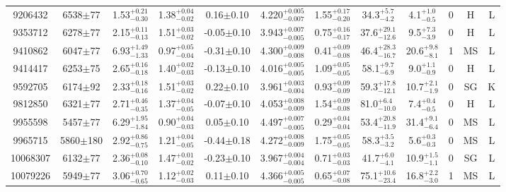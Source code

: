\begin{landscape}
\begin{longtable}{c|ccccc|ccc|ccc}
	9206432 & 6538$\pm$77    & 1.53$_{-0.30}^{+0.21}$    & 1.38$_{-0.02}^{+0.04}$ & 0.16$\pm$0.10     & 4.220$_{-0.007}^{+0.005}$ & 1.55$_{-0.20}^{+0.17}$ & 34.3$_{-4.2}^{+5.7}$      & 4.1$_{-0.5}^{+1.0}$      & 0 &        H & L \\
	9353712 & 6278$\pm$77    & 2.15$_{-0.13}^{+0.11}$    & 1.51$_{-0.02}^{+0.03}$ & -0.05$\pm$0.10    & 3.943$_{-0.005}^{+0.007}$ & 0.75$_{-0.17}^{+0.16}$ & 37.6$_{-12.6}^{+29.1}$    & 9.5$_{-3.9}^{+7.3}$      & 0 &        H & L \\
	9410862 & 6047$\pm$77    & 6.93$_{-1.33}^{+1.49}$    & 0.97$_{-0.04}^{+0.05}$ & -0.31$\pm$0.10    & 4.300$_{-0.008}^{+0.009}$ & 0.41$_{-0.08}^{+0.09}$ & 46.4$_{-16.7}^{+28.3}$    & 20.6$_{-8.1}^{+9.8}$     & 1 &        MS & L \\
	9414417 & 6253$\pm$75    & 2.65$_{-0.18}^{+0.16}$    & 1.40$_{-0.03}^{+0.02}$ & -0.13$\pm$0.10    & 4.016$_{-0.005}^{+0.005}$ & 1.09$_{-0.05}^{+0.05}$ & 58.1$_{-6.9}^{+9.7}$      & 9.0$_{-0.9}^{+1.1}$      & 0 &        H & L \\
	9592705 & 6174$\pm$92    & 2.33$_{-0.16}^{+0.18}$    & 1.51$_{-0.02}^{+0.03}$ & 0.22$\pm$0.10     & 3.961$_{-0.004}^{+0.003}$ & 0.93$_{-0.09}^{+0.09}$ & 59.3$_{-12.1}^{+17.8}$    & 10.7$_{-1.9}^{+2.1}$     & 0 &        SG & K \\
	9812850 & 6321$\pm$77    & 2.71$_{-0.35}^{+0.46}$    & 1.37$_{-0.05}^{+0.04}$ & -0.07$\pm$0.10    & 4.053$_{-0.009}^{+0.008}$ & 1.54$_{-0.08}^{+0.09}$ & 81.0$_{-10.0}^{+6.4}$      & 7.4$_{-0.5}^{+0.4}$     & 0 &        H & L \\
	9955598 & 5457$\pm$77    & 6.29$_{-1.84}^{+1.95}$    & 0.90$_{-0.03}^{+0.04}$ & 0.05$\pm$0.10     & 4.497$_{-0.005}^{+0.007}$ & 0.29$_{-0.04}^{+0.04}$ & 53.4$_{-11.9}^{+20.8}$    & 31.4$_{-6.4}^{+9.1}$     & 0 &        MS & L \\
	9965715 & 5860$\pm$180   & 2.92$_{-0.75}^{+0.86}$    & 1.21$_{-0.05}^{+0.04}$ & -0.44$\pm$0.18    & 4.272$_{-0.009}^{+0.008}$ & 1.75$_{-0.05}^{+0.05}$ & 58.3$_{-3.2}^{+3.5}$      & 5.6$_{-0.3}^{+0.3}$      & 0 &        MS & L \\
	10068307 & 6132$\pm$77   & 2.36$_{-0.10}^{+0.08}$    & 1.47$_{-0.02}^{+0.01}$ & -0.23$\pm$0.10    & 3.967$_{-0.004}^{+0.004}$ & 0.71$_{-0.03}^{+0.03}$ & 41.7$_{-4.1}^{+6.0}$      & 10.9$_{-1.1}^{+1.5}$     & 0 &        SG & L \\
	10079226 & 5949$\pm$77   & 3.06$_{-0.65}^{+0.70}$    & 1.12$_{-0.03}^{+0.02}$ & 0.11$\pm$0.10     & 4.366$_{-0.005}^{+0.005}$ & 0.65$_{-0.08}^{+0.07}$ & 75.1$_{-23.4}^{+10.6}$    & 16.8$_{-3.0}^{+2.2}$     & 1 &        MS & L \\

\end{longtable}
\end{landscape}
